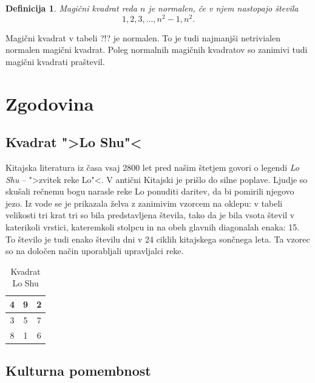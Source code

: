 \documentclass[a4paper,12pt]{article}
\newtheorem{definicija}[izrek]{Definicija}
\begin{document}
\begin{definicija}
   Magični kvadrat reda $n$ je \emph{normalen}, če v njem nastopajo števila
   \begin{equation}
      \label{eq:numbers}
      1, 2, 3, \ldots, n^2-1, n^2.
   \end{equation}
\end{definicija}

Magični kvadrat v tabeli ?!? je normalen.
To je tudi najmanjši netrivialen normalen magični kvadrat.
Poleg normalnih magičnih kvadratov so zanimivi tudi magični kvadrati praštevil.

\newpage

\section{Zgodovina}

\subsection{Kvadrat ">Lo Shu"<}

Kitajska literatura iz časa vsaj 2800 let pred našim štetjem govori o legendi
\emph{Lo Shu} -- ">zvitek reke Lo"<. V antični Kitajski je prišlo do
silne poplave. Ljudje so skušali rečnemu bogu narasle reke Lo ponuditi daritev,
da bi pomirili njegovo jezo. Iz vode se je prikazala želva z zanimivim vzorcem
na oklepu: v tabeli velikosti tri krat tri so bila predstavljena števila, tako
da je bila vsota števil v katerikoli vrstici, kateremkoli stolpcu in na obeh
glavnih diagonalah enaka: 15. To število je tudi enako številu dni v 24 ciklih
kitajskega sončnega leta. Ta vzorec so na določen način uporabljali upravljalci
reke.

\begin{table}
   \centering
   \caption{Kvadrat Lo Shu}
   \label{table:loshu}
	\begin{tabular}{|c|c|c|}
   \hline
	4 & 9 & 2 \\\hline
3 & 5 & 7 \\\hline
8 & 1 & 6 \\\hline
\end{tabular}
\end{table}

\newpage

\subsection{Kulturna pomembnost}
\end{document}
